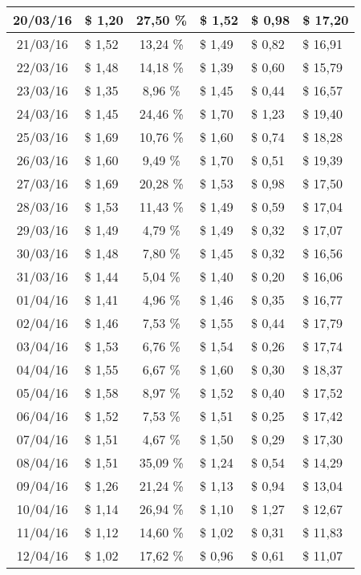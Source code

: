 \begin{center}
\begin{small}
\begin{longtable}{|c|l|c|l|l|l|}
20/03/16 & \$ 1,20 & 27,50 \% & \$ 1,52 & \$ 0,98 & \$ 17,20 \\ \hline
21/03/16 & \$ 1,52 & 13,24 \% & \$ 1,49 & \$ 0,82 & \$ 16,91 \\ \hline
22/03/16 & \$ 1,48 & 14,18 \% & \$ 1,39 & \$ 0,60 & \$ 15,79 \\ \hline
23/03/16 & \$ 1,35 & 8,96 \% & \$ 1,45 & \$ 0,44 & \$ 16,57 \\ \hline
24/03/16 & \$ 1,45 & 24,46 \% & \$ 1,70 & \$ 1,23 & \$ 19,40 \\ \hline
25/03/16 & \$ 1,69 & 10,76 \% & \$ 1,60 & \$ 0,74 & \$ 18,28 \\ \hline
26/03/16 & \$ 1,60 & 9,49 \% & \$ 1,70 & \$ 0,51 & \$ 19,39 \\ \hline
27/03/16 & \$ 1,69 & 20,28 \% & \$ 1,53 & \$ 0,98 & \$ 17,50 \\ \hline
28/03/16 & \$ 1,53 & 11,43 \% & \$ 1,49 & \$ 0,59 & \$ 17,04 \\ \hline
29/03/16 & \$ 1,49 & 4,79 \% & \$ 1,49 & \$ 0,32 & \$ 17,07 \\ \hline
30/03/16 & \$ 1,48 & 7,80 \% & \$ 1,45 & \$ 0,32 & \$ 16,56 \\ \hline
31/03/16 & \$ 1,44 & 5,04 \% & \$ 1,40 & \$ 0,20 & \$ 16,06 \\ \hline
01/04/16 & \$ 1,41 & 4,96 \% & \$ 1,46 & \$ 0,35 & \$ 16,77 \\ \hline
02/04/16 & \$ 1,46 & 7,53 \% & \$ 1,55 & \$ 0,44 & \$ 17,79 \\ \hline
03/04/16 & \$ 1,53 & 6,76 \% & \$ 1,54 & \$ 0,26 & \$ 17,74 \\ \hline
04/04/16 & \$ 1,55 & 6,67 \% & \$ 1,60 & \$ 0,30 & \$ 18,37 \\ \hline
05/04/16 & \$ 1,58 & 8,97 \% & \$ 1,52 & \$ 0,40 & \$ 17,52 \\ \hline
06/04/16 & \$ 1,52 & 7,53 \% & \$ 1,51 & \$ 0,25 & \$ 17,42 \\ \hline
07/04/16 & \$ 1,51 & 4,67 \% & \$ 1,50 & \$ 0,29 & \$ 17,30 \\ \hline
08/04/16 & \$ 1,51 & 35,09 \% & \$ 1,24 & \$ 0,54 & \$ 14,29 \\ \hline
09/04/16 & \$ 1,26 & 21,24 \% & \$ 1,13 & \$ 0,94 & \$ 13,04 \\ \hline
10/04/16 & \$ 1,14 & 26,94 \% & \$ 1,10 & \$ 1,27 & \$ 12,67 \\ \hline
11/04/16 & \$ 1,12 & 14,60 \% & \$ 1,02 & \$ 0,31 & \$ 11,83 \\ \hline
12/04/16 & \$ 1,02 & 17,62 \% & \$ 0,96 & \$ 0,61 & \$ 11,07 \\ \hline

\end{longtable}
\end{small}
\end{center}
